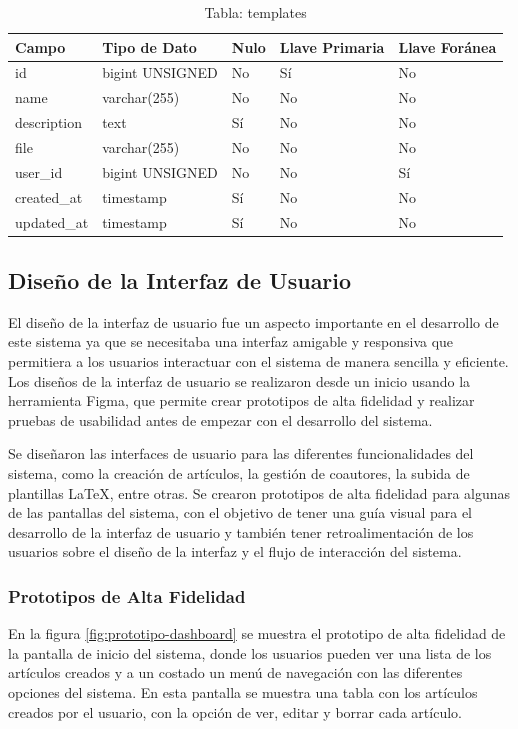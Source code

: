 \begin{table}[H]
    \centering
    \begin{tabular}{|p{5cm}|p{3cm}|p{1cm}|p{2cm}|p{2cm}|}
        \hline
        \textbf{Campo} & \textbf{Tipo de Dato} & \textbf{Nulo} & \textbf{Llave Primaria} & \textbf{Llave Foránea} \\
        \hline
        id & bigint UNSIGNED & No & Sí & No \\
        name & varchar(255) & No & No & No \\
        description & text & Sí & No & No \\
        file & varchar(255) & No & No & No \\
        user\_id & bigint UNSIGNED & No & No & Sí \\
        created\_at & timestamp & Sí & No & No \\
        updated\_at & timestamp & Sí & No & No \\
        \hline
    \end{tabular}
    \caption{Tabla: templates}
    \label{tab:templates}

\end{table}

\subsection{Diseño de la Interfaz de Usuario}
El diseño de la interfaz de usuario fue un aspecto importante en el desarrollo de este sistema ya que se necesitaba una interfaz amigable y responsiva que permitiera a los usuarios interactuar con el sistema de manera sencilla y eficiente. Los diseños de la interfaz de usuario se realizaron desde un inicio usando la herramienta Figma, que permite crear prototipos de alta fidelidad y realizar pruebas de usabilidad antes de empezar con el desarrollo del sistema.

Se diseñaron las interfaces de usuario para las diferentes funcionalidades del sistema, como la creación de artículos, la gestión de coautores, la subida de plantillas LaTeX, entre otras. Se crearon prototipos de alta fidelidad para algunas de las pantallas del sistema, con el objetivo de tener una guía visual para el desarrollo de la interfaz de usuario y también tener retroalimentación de los usuarios sobre el diseño de la interfaz y el flujo de interacción del sistema.

\subsubsection{Prototipos de Alta Fidelidad}
En la figura \ref{fig:prototipo-dashboard} se muestra el prototipo de alta fidelidad de la pantalla de inicio del sistema, donde los usuarios pueden ver una lista de los artículos creados y a un costado un menú de navegación con las diferentes opciones del sistema. En esta pantalla se muestra una tabla con los artículos creados por el usuario, con la opción de ver, editar y borrar cada artículo.

